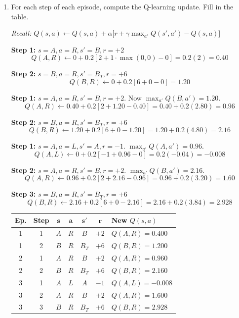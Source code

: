 \documentclass[12pt]{article}
\begin{document}
\begin{enumerate}[label=(\alph*)]
\item For each step of each episode, compute the Q-learning update. Fill in the table.

\textit{Recall:} $Q(s,a) \leftarrow Q(s,a) + \alpha\big[r + \gamma \max_{a'} Q(s',a') - Q(s,a)\big]$

\begin{stepbox}
\textbf{Step 1:} $s=A, a=R, s'=B, r=+2$
\[
Q(A,R) \leftarrow 0 + 0.2[2 + 1 \cdot \max(0,0) - 0] = 0.2(2) = 0.40
\]

\textbf{Step 2:} $s=B, a=R, s'=B_T, r=+6$
\[
Q(B,R) \leftarrow 0 + 0.2[6 + 0 - 0] = 1.20
\]
\end{stepbox}

\begin{stepbox}[Episode 2]
\textbf{Step 1:} $s=A, a=R, s'=B, r=+2$. Now $\max_{a'}Q(B,a') = 1.20$.
\[
Q(A,R) \leftarrow 0.40 + 0.2[2 + 1.20 - 0.40] = 0.40 + 0.2(2.80) = 0.96
\]

\textbf{Step 2:} $s=B, a=R, s'=B_T, r=+6$
\[
Q(B,R) \leftarrow 1.20 + 0.2[6 + 0 - 1.20] = 1.20 + 0.2(4.80) = 2.16
\]
\end{stepbox}

\begin{stepbox}[Episode 3]
\textbf{Step 1:} $s=A, a=L, s'=A, r=-1$. $\max_{a'}Q(A,a') = 0.96$.
\[
Q(A,L) \leftarrow 0 + 0.2[-1 + 0.96 - 0] = 0.2(-0.04) = -0.008
\]

\textbf{Step 2:} $s=A, a=R, s'=B, r=+2$. $\max_{a'}Q(B,a') = 2.16$.
\[
Q(A,R) \leftarrow 0.96 + 0.2[2 + 2.16 - 0.96] = 0.96 + 0.2(3.20) = 1.60
\]

\textbf{Step 3:} $s=B, a=R, s'=B_T, r=+6$
\[
Q(B,R) \leftarrow 2.16 + 0.2[6 + 0 - 2.16] = 2.16 + 0.2(3.84) = 2.928
\]
\end{stepbox}

\begin{resultsbox}
\begin{center}
\begin{tabular}{ccccccl}
\toprule
\textbf{Ep.} & \textbf{Step} & $\mathbf{s}$ & $\mathbf{a}$ & $\mathbf{s'}$ & $\mathbf{r}$ & \textbf{New $Q(s,a)$} \\
\midrule
1 & 1 & $A$ & $R$ & $B$ & $+2$ & $Q(A,R) = 0.400$ \\[0.4em]
1 & 2 & $B$ & $R$ & $B_T$ & $+6$ & $Q(B,R) = 1.200$ \\[0.4em]
\midrule
2 & 1 & $A$ & $R$ & $B$ & $+2$ & $Q(A,R) = 0.960$ \\[0.4em]
2 & 2 & $B$ & $R$ & $B_T$ & $+6$ & $Q(B,R) = 2.160$ \\[0.4em]
\midrule
3 & 1 & $A$ & $L$ & $A$ & $-1$ & $Q(A,L) = -0.008$ \\[0.4em]
3 & 2 & $A$ & $R$ & $B$ & $+2$ & $Q(A,R) = 1.600$ \\[0.4em]
3 & 3 & $B$ & $R$ & $B_T$ & $+6$ & $Q(B,R) = 2.928$ \\[0.4em]
\bottomrule
\end{tabular}
\end{center}
\end{resultsbox}


\end{enumerate}
\end{document}
